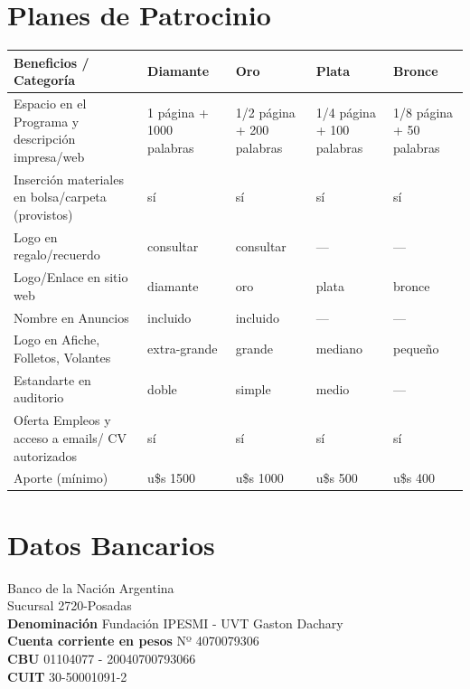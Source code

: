 \documentclass[11pt,a4paper]{report}
\begin{document}
\section*{Planes de Patrocinio}
\begin{center}

\begin{tabular}{|p{4cm}|p{2.5cm}|p{2.5cm}|p{2.5cm}|p{2.5cm}|}
\hline
Beneficios / Categoría & Diamante & Oro  & Plata & Bronce \\
\hline
Espacio en el Programa y descripción impresa/web & 1 página +
1000 palabras & 1/2 página + 200 palabras & 1/4 página + 100 palabras &  1/8 página + 50 palabras\\
\hline
Inserción materiales en bolsa/carpeta (provistos) & sí & sí & sí & sí \\
\hline
Logo en regalo/recuerdo & consultar & consultar & --- & --- \\
\hline
Logo/Enlace en sitio web & diamante & oro & plata & bronce \\
\hline
Nombre en Anuncios & incluido & incluido & --- & --- \\
\hline
Logo en Afiche, Folletos, Volantes & extra-grande & grande & mediano & pequeño \\
\hline
Estandarte en auditorio & doble & simple & medio & --- \\
\hline
Oferta Empleos y acceso a emails/ CV autorizados  & sí & sí & sí & sí \\
\hline
Aporte (mínimo) & u\$s 1500 & u\$s 1000 & u\$s 500 & u\$s 400\\
\hline
\end{tabular}
\end{center}

\section*{Datos Bancarios}
\noindent Banco de la Nación Argentina \\
Sucursal 2720-Posadas \\
\textbf{Denominación} Fundación IPESMI - UVT Gaston Dachary \\
\textbf{Cuenta corriente en pesos} Nº 4070079306 \\
\textbf{CBU} 01104077 - 20040700793066 \\
\textbf{CUIT} 30-50001091-2 \\
\end{document}
